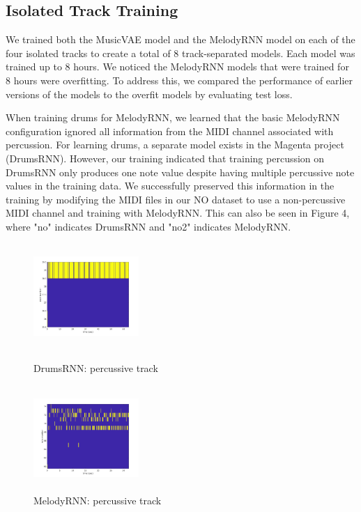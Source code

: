 \documentclass{article}
\begin{document}
\subsection{Isolated Track Training}
We trained both the MusicVAE model and the MelodyRNN model on each of the four isolated tracks to create a total of 8 track-separated models. Each model was trained up to 8 hours. We noticed the MelodyRNN models that were trained for 8 hours were overfitting. To address this, we compared the performance of earlier versions of the models to the overfit models by evaluating test loss.

When training drums for MelodyRNN, we learned that the basic MelodyRNN configuration ignored all information from the MIDI channel associated with percussion. For learning drums, a separate model exists in the Magenta project (DrumsRNN). However, our training indicated that training percussion on DrumsRNN only produces one note value despite having multiple percussive note values in the training data. We successfully preserved this information in the training by modifying the MIDI files in our NO dataset to use a non-percussive MIDI channel and training with MelodyRNN. This can also be seen in Figure 4, where "no" indicates DrumsRNN and "no2" indicates MelodyRNN.


\begin{figure}[htb!]
  \begin{minipage}{0.48\textwidth}
    \centering
    \includegraphics[height=4cm, width=4cm]{img/DrumRNN_drum.jpg}
    \caption{DrumsRNN: percussive track}
  \end{minipage}\hfill
  \begin{minipage}{0.48\textwidth}
    \centering
    \includegraphics[height=4cm, width=4cm]{img/MelodyRNN_drum.jpg}
    \caption{MelodyRNN: percussive track}
  \end{minipage}
\end{figure}
\end{document}
